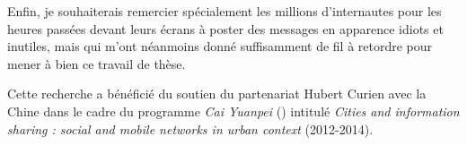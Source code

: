 Enfin, je souhaiterais remercier spécialement les millions d'internautes pour les heures passées devant leurs écrans à poster des messages en apparence idiots et inutiles, mais qui m'ont néanmoins donné suffisamment de fil à retordre pour mener à bien ce travail de thèse.

\bigskip
Cette recherche a bénéficié du soutien du partenariat Hubert Curien avec la Chine dans le cadre du programme \textit{Cai Yuanpei} () intitulé \textit{Cities and information sharing : social and mobile networks in urban context} (2012-2014).